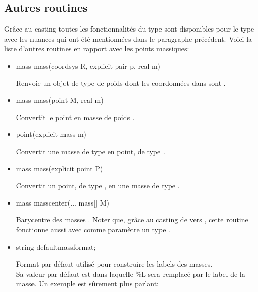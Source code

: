\documentclass[pdftex]{article}
\begin{document}
\subsection{Autres routines}
Grâce au \og{}casting\fg{} toutes les fonctionnalités du type  sont
disponibles pour le type  avec les nuances qui ont été
mentionnées dans le paragraphe précédent. Voici la liste d'autres
routines en rapport avec les points massiques:
\begin{itemize}
\item {}
    \begin{Vcolor}
    mass mass(coordsys R, explicit pair p, real m)
  \end{Vcolor}
  Renvoie un objet de type  de poids  dont les coordonnées dans
   sont .
\item {}
    \begin{Vcolor}
    mass mass(point M, real m)
  \end{Vcolor}
  Convertit le point  en masse de poids .
\item {}
    \begin{Vcolor}
    point(explicit mass m)
  \end{Vcolor}
  Convertit une masse de type  en point, de type .
\item {}
    \begin{Vcolor}
    mass mass(explicit point P)
  \end{Vcolor}
  Convertit un point, de type , en une masse de type .
\item {}
    \begin{Vcolor}
    mass masscenter(... mass[] M)
  \end{Vcolor}
  Barycentre des masses . Noter que, grâce au \og{}casting\fg{}
  de  vers , cette routine fonctionne aussi
  avec comme paramètre un type .
\item {}
    \begin{Vcolor}
    string defaultmassformat;
  \end{Vcolor}
  Format par défaut utilisé pour construire les labels des masses.\\
  Sa valeur par défaut est
   dans
  laquelle \%L sera remplacé par le label de la masse. Un exemple est
  sûrement plus parlant:


\end{itemize}
\end{document}
